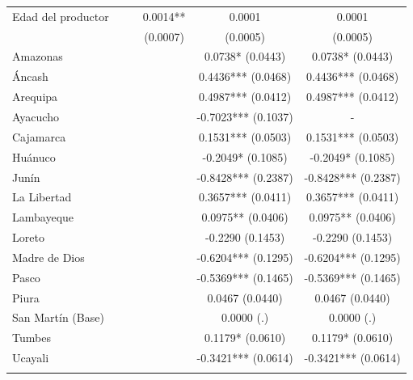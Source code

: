 \documentclass[11pt,a4paper,twocolumn]{article}
\begin{document}
\begin{table}[t]
\begin{tabular*}{\textwidth}{@{\extracolsep{\fill}}lccccc@{}}
Edad del productor          &           &          & 0.0014** & 0.0001  & {0.0001} \\
                            &           &          & (0.0007) & (0.0005)  & {(0.0005)} \\
Amazonas                    &           &          &          & 0.0738* (0.0443)   & 0.0738* (0.0443) \\
Áncash                      &           &          &          & 0.4436*** (0.0468) & 0.4436*** (0.0468) \\
Arequipa                    &           &          &          & 0.4987*** (0.0412) & 0.4987*** (0.0412) \\
Ayacucho                    &           &          &          & -0.7023*** (0.1037) & - \\
Cajamarca                   &           &          &          & 0.1531*** (0.0503) & 0.1531*** (0.0503) \\
Huánuco                     &           &          &          & -0.2049* (0.1085)  & -0.2049* (0.1085) \\
Junín                       &           &          &          & -0.8428*** (0.2387) & -0.8428*** (0.2387) \\
La Libertad                 &           &          &          & 0.3657*** (0.0411) & 0.3657*** (0.0411) \\
Lambayeque                  &           &          &          & 0.0975** (0.0406)  & 0.0975** (0.0406) \\
Loreto                      &           &          &          & -0.2290 (0.1453)   & -0.2290 (0.1453) \\
Madre de Dios               &           &          &          & -0.6204*** (0.1295) & -0.6204*** (0.1295) \\
Pasco                       &           &          &          & -0.5369*** (0.1465) & -0.5369*** (0.1465) \\
Piura                       &           &          &          & 0.0467 (0.0440)    & 0.0467 (0.0440) \\
San Martín (Base)           &           &          &          & 0.0000 (.)         & 0.0000 (.) \\
Tumbes                      &           &          &          & 0.1179* (0.0610)   & 0.1179* (0.0610) \\
Ucayali                     &           &          &          & -0.3421*** (0.0614) & -0.3421*** (0.0614) \\
\addlinespace[0.1cm]

\end{tabular*}
\end{table}
\end{document}
